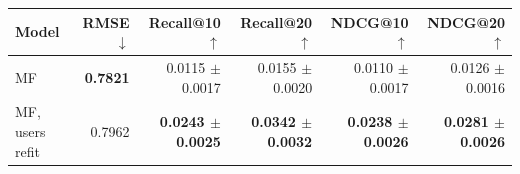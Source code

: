 \begin{tabular}{lrrrrr}
\toprule
Model & RMSE $\downarrow$ & Recall@10 $\uparrow$ & Recall@20 $\uparrow$ & NDCG@10 $\uparrow$ & NDCG@20 $\uparrow$ \\
\midrule
MF & \textbf{0.7821} & 0.0115 $\pm$ 0.0017 & 0.0155 $\pm$ 0.0020 & 0.0110 $\pm$ 0.0017 & 0.0126 $\pm$ 0.0016 \\
MF, users refit & 0.7962 & \textbf{0.0243 $\pm$ 0.0025} & \textbf{0.0342 $\pm$ 0.0032} & \textbf{0.0238 $\pm$ 0.0026} & \textbf{0.0281 $\pm$ 0.0026} \\
\bottomrule
\end{tabular}
